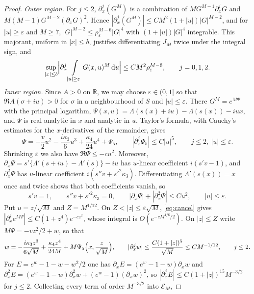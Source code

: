 \documentclass{math}
\let\TJMoriginalint\int
\renewcommand{\int}{\TJMoriginalint\limits}
\newcommand{\R}{\mathbb R}
\newcommand{\ii}{\mathit{i}}
\newcommand{\dd}{\,\mathrm d}
\begin{document}
\begin{proof}
\emph{Outer region.} For $j\le2$, $\partial_x^j(G^M)$ is a combination of $MG^{M-1}\partial_x^jG$ and $M(M-1)G^{M-2}(\partial_xG)^2$. Hence $|\partial_x^j(G^M)|\le CM^2(1+|u|)|G|^{M-2}$, and for $|u|\ge\varepsilon$ and $M\ge7$, $|G|^{M-2}\le\rho_\varepsilon^{M-6}|G|^4$ with $(1+|u|)|G|^4$ integrable. This majorant, uniform in $|x|\le b$, justifies differentiating $J_M$ twice under the integral sign, and
\begin{equation}\label{eq:outer}
\sup_{|x|\le b}\Bigl|\partial_x^j\int_{|u|\ge\varepsilon}G(x,u)^M\dd u\Bigr|\le CM^2\rho_\varepsilon^{M-6},\qquad j=0,1,2 .
\end{equation}
\emph{Inner region.} Since $A>0$ on $\R$, we may choose $\varepsilon\in(0,1]$ so that $\Re A(\sigma+\ii u)>0$ for $\sigma$ in a neighbourhood of $S$ and $|u|\le\varepsilon$. There $G^M=e^{M\Psi}$ with the principal logarithm, $\Psi(x,u)=\Lambda(s(x)+\ii u)-\Lambda(s(x))-\ii ux$, and $\Psi$ is real-analytic in $x$ and analytic in $u$. Taylor's formula, with Cauchy's estimates for the $x$-derivatives of the remainder, gives
\begin{equation}\label{eq:Psi}
\Psi=-\frac v2u^2-\frac{\ii\kappa_3}6u^3+\frac{\kappa_4}{24}u^4+\Psi_5,\qquad |\partial_x^j\Psi_5|\le C|u|^5,\qquad j\le2,\ |u|\le\varepsilon .
\end{equation}
Shrinking $\varepsilon$ we also have $\Re\Psi\le-cu^2$. Moreover, $\partial_x\Psi=s'\{\Lambda'(s+\ii u)-\Lambda'(s)\}-\ii u$ has $u$-linear coefficient $\ii(s'v-1)$, and $\partial_x^2\Psi$ has $u$-linear coefficient $\ii(s''v+s'^2\kappa_3)$. Differentiating $\Lambda'(s(x))=x$ once and twice shows that both coefficients vanish, so
\begin{equation}\label{eq:cancel}
s'v=1,\qquad s''v+s'^2\kappa_3=0,\qquad |\partial_x\Psi|+|\partial_x^2\Psi|\le Cu^2,\qquad |u|\le\varepsilon .
\end{equation}
Put $u=z/\sqrt M$ and $Z=M^{1/12}$. On $Z<|z|\le\varepsilon\sqrt M$, \eqref{eq:cancel} gives $|\partial_x^je^{M\Psi}|\le C(1+z^4)e^{-cz^2}$, whose integral is $O(e^{-cM^{1/6}/2})$. On $|z|\le Z$ write $M\Psi=-vz^2/2+w$, so that
\begin{equation}\label{eq:w}
w=-\frac{\ii\kappa_3z^3}{6\sqrt M}+\frac{\kappa_4z^4}{24M}+M\Psi_5\Bigl(x,\frac z{\sqrt M}\Bigr),\qquad |\partial_x^jw|\le\frac{C(1+|z|)^5}{\sqrt M}\le CM^{-1/12},\qquad j\le2 .
\end{equation}
For $E=e^w-1-w-w^2/2$ one has $\partial_xE=(e^w-1-w)\partial_xw$ and $\partial_x^2E=(e^w-1-w)\partial_x^2w+(e^w-1)(\partial_xw)^2$, so $|\partial_x^jE|\le C(1+|z|)^{15}M^{-3/2}$ for $j\le2$. Collecting every term of order $M^{-3/2}$ into $\mathcal E_M$,

\end{proof}
\end{document}
